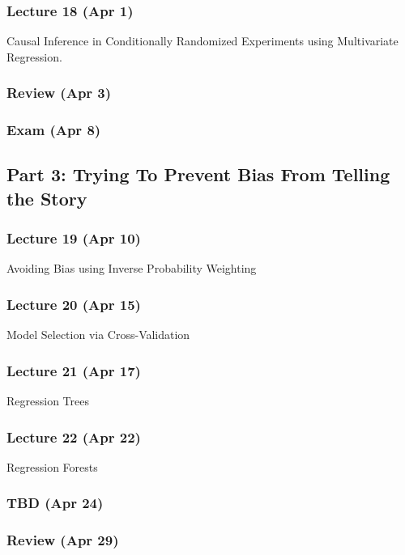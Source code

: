 \documentclass[12pt]{article}
\begin{document}
\subsubsection*{Lecture 18 (Apr 1)}
Causal Inference in Conditionally Randomized Experiments using Multivariate Regression. 

\subsubsection*{Review (Apr 3)}
\subsubsection*{Exam (Apr 8)}

\subsection*{Part 3: Trying To Prevent Bias From Telling the Story}

\subsubsection*{Lecture 19 (Apr 10)}
Avoiding Bias using Inverse Probability Weighting 
\subsubsection*{Lecture 20 (Apr 15)}
Model Selection via Cross-Validation         
\subsubsection*{Lecture 21 (Apr 17)}
Regression Trees  
\subsubsection*{Lecture 22 (Apr 22)}
Regression Forests 
\subsubsection*{TBD    (Apr 24)}
\subsubsection*{Review (Apr 29)}
\end{document}

